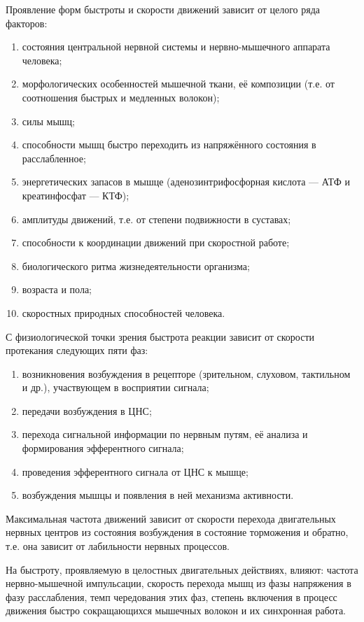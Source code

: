 Проявление форм быстроты и скорости движений зависит от целого ряда факторов:
\begin{enumerate}
    \item состояния центральной нервной системы и нервно-мышечного аппарата человека;
    \item морфологических особенностей мышечной ткани, её композиции (т.е. от соотношения быстрых и медленных волокон);
    \item силы мышц;
    \item способности мышц быстро переходить из напряжённого состояния в расслабленное;
    \item энергетических запасов в мышце (аденозинтрифосфорная кислота — АТФ и креатинфосфат — КТФ);
    \item амплитуды движений, т.е. от степени подвижности в суставах;
    \item способности к координации движений при скоростной работе;
    \item биологического ритма жизнедеятельности организма;
    \item возраста и пола;
    \item скоростных природных способностей человека.
\end{enumerate}

С физиологической точки зрения быстрота реакции зависит от скорости протекания следующих пяти фаз:
\begin{enumerate}
    \item возникновения возбуждения в рецепторе (зрительном, слуховом, тактильном и др.), участвующем в восприятии сигнала;
    \item передачи возбуждения в ЦНС;
    \item перехода сигнальной информации по нервным путям, её анализа и формирования эфферентного сигнала;
    \item проведения эфферентного сигнала от ЦНС к мышце;
    \item возбуждения мышцы и появления в ней механизма активности.
\end{enumerate}

Максимальная частота движений зависит от скорости перехода двигательных нервных центров из состояния возбуждения в состояние торможения и обратно, т.е. она зависит от лабильности нервных процессов.

На быстроту, проявляемую в целостных двигательных действиях, влияют: частота нервно-мышечной импульсации, скорость перехода мышц из фазы напряжения в фазу расслабления, темп чередования этих фаз, степень включения в процесс движения быстро сокращающихся мышечных волокон и их синхронная работа.

